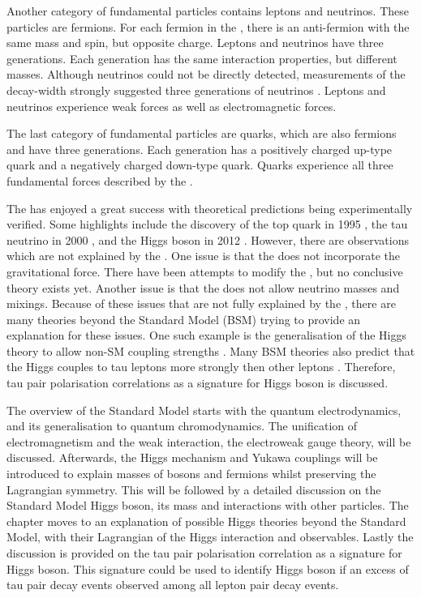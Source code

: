 Another category of fundamental particles contains leptons and neutrinos. These particles are fermions. For each fermion in the \SM, there is an anti-fermion with the same mass and spin, but opposite charge. Leptons and neutrinos have three generations. Each generation has the same interaction properties, but different masses. Although neutrinos could not be directly detected, measurements of the \PZ decay-width strongly suggested three generations of neutrinos \cite{ALEPH:2005ab}. Leptons and neutrinos experience weak forces as well as electromagnetic forces.

The last category of fundamental particles are quarks, which are also fermions and have three generations. Each generation has a positively charged up-type quark and a negatively charged down-type quark. Quarks experience all three fundamental forces described by the \SM.

The \SM has enjoyed a great success with theoretical predictions being experimentally verified. Some highlights include the discovery of the top quark in 1995 \cite{Abachi:1995iq}, the tau neutrino in 2000 \cite{Kodama:2000mp}, and the Higgs boson in 2012 \cite{Aad:2012tfa,Chatrchyan:2012ufa}. However, there are observations which are not explained by the \SM. One issue is that the \SM does not incorporate the gravitational force. There have been attempts to modify the \SM, but no conclusive theory exists yet. Another issue is that the \SM does not allow neutrino masses and mixings. Because of these issues that are not fully explained by the \SM, there are many theories beyond the Standard Model (BSM) trying to provide an explanation for these issues. One such example is the generalisation of the Higgs theory to allow non-SM coupling strengths \cite{Kaplan:1983fs,Goldberger:2008zz}. Many BSM theories also predict that the Higgs couples to tau leptons more strongly then other leptons \cite{Duperrin:2008in}. Therefore, tau pair polarisation correlations as a signature for Higgs boson is discussed.

The overview of the Standard Model starts with the quantum electrodynamics, and its generalisation to quantum chromodynamics. The unification of electromagnetism and the weak interaction, the electroweak gauge theory, will be discussed. Afterwards, the Higgs mechanism and Yukawa couplings will be introduced to explain masses of bosons and fermions whilst preserving the Lagrangian symmetry. This will be followed by a detailed discussion on the Standard Model Higgs boson, its mass and interactions with other particles. The chapter moves to an explanation of possible Higgs theories beyond the Standard Model, with their  Lagrangian of the Higgs interaction and observables. Lastly the discussion is provided on  the tau pair polarisation correlation as a signature for Higgs boson. This signature could be used to identify Higgs boson if an excess of tau pair decay events observed among all lepton pair decay events.


